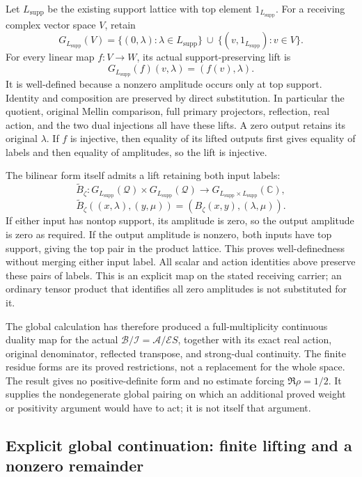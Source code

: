 Let \(L_{\mathrm{supp}}\) be the existing support lattice with top
element \(1_{L_{\mathrm{supp}}}\). For a receiving complex vector space
\(V\), retain \[
G_{L_{\mathrm{supp}}}(V)
=\{(0,\lambda):\lambda\in L_{\mathrm{supp}}\}
\ \cup\
\{(v,1_{L_{\mathrm{supp}}}):v\in V\}.
\tag{GZR9.1}
\] For every linear map \(f:V\to W\), its actual support-preserving lift
is \[
G_{L_{\mathrm{supp}}}(f)(v,\lambda)=(f(v),\lambda).
\tag{GZR9.2}
\] It is well-defined because a nonzero amplitude occurs only at top
support. Identity and composition are preserved by direct substitution.
In particular the quotient, original Mellin comparison, full primary
projectors, reflection, real action, and the two dual injections all
have these lifts. A zero output retains its original \(\lambda\). If
\(f\) is injective, then equality of its lifted outputs first gives
equality of labels and then equality of amplitudes, so the lift is
injective.

The bilinear form itself admits a lift retaining both input labels: \[
\widetilde B_\zeta:
G_{L_{\mathrm{supp}}}(\mathcal Q)\times
G_{L_{\mathrm{supp}}}(\mathcal Q)
\longrightarrow G_{L_{\mathrm{supp}}\times L_{\mathrm{supp}}}(\mathbb C),
\] \[
\widetilde B_\zeta((x,\lambda),(y,\mu))
=(B_\zeta(x,y),(\lambda,\mu)).
\tag{GZR9.3}
\] If either input has nontop support, its amplitude is zero, so the
output amplitude is zero as required. If the output amplitude is
nonzero, both inputs have top support, giving the top pair in the
product lattice. This proves well-definedness without merging either
input label. All scalar and action identities above preserve these pairs
of labels. This is an explicit map on the stated receiving carrier; an
ordinary tensor product that identifies all zero amplitudes is not
substituted for it.

The global calculation has therefore produced a full-multiplicity
continuous duality map for the actual
\(\mathcal B/\mathcal I=\mathcal A/\mathcal ES\), together with its
exact real action, original denominator, reflected transpose, and
strong-dual continuity. The finite residue forms are its proved
restrictions, not a replacement for the whole space. The result gives no
positive-definite form and no estimate forcing \(\Re\rho=1/2\). It
supplies the nondegenerate global pairing on which an additional proved
weight or positivity argument would have to act; it is not itself that
argument.

\subsection{Explicit global continuation: finite lifting and a nonzero
remainder}\label{explicit-global-continuation-finite-lifting-and-a-nonzero-remainder-occurrence-3}

